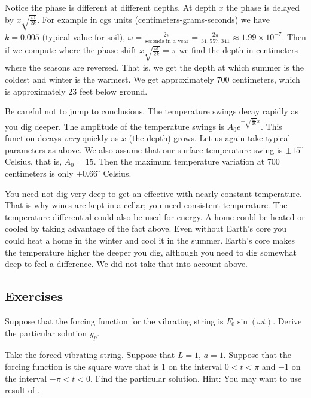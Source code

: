 Notice the phase is different at different depths.  At depth $x$ the
phase is delayed by $x \sqrt{\frac{\omega}{2k}}$.
For example in cgs units (centimeters-grams-seconds)
we have $k=0.005$ (typical value for soil),
$\omega = \frac{2\pi}{\text{seconds in a year}}
= \frac{2\pi}{31,557,341} \approx 1.99 \times {10}^{-7}$.   Then
if we compute where the phase shift $x \sqrt{\frac{\omega}{2k}} = \pi$
we find the depth in centimeters where the seasons are reversed.  That is,
we get the depth at which summer is the coldest and winter is the warmest.
We get
approximately 700 centimeters, which is approximately 23 feet below ground.

Be careful not to jump to conclusions.  The temperature swings decay rapidly as you dig deeper.  The
amplitude of the temperature swings is
$A_0 e^{-\sqrt{\frac{\omega}{2k}} x}$.  This function decays \emph{very}
quickly as $x$ (the depth) grows.
Let us again take
typical parameters as above.  We also assume that
our surface temperature swing is $\pm {15}^\circ$ Celsius, that is,
$A_0 = 15$.  Then the maximum temperature variation at 700 centimeters
is only $\pm {0.66}^\circ$ Celsius.

You need not dig very deep to get an effective
 with nearly constant temperature.  That is why wines are kept in a cellar; you need consistent
temperature.
The temperature differential could also be used for energy.  A home could
be heated or cooled by taking advantage of the fact above.
Even without Earth's core you could heat a home in the winter and cool it
in the summer.  Earth's core makes the
temperature higher the deeper you dig, although you need to dig somewhat
deep to feel a difference.
We did not take that into account above.

\subsection{Exercises}

\begin{exercise} \label{sps:sinforceexr}
Suppose that the forcing function for the vibrating string
is $F_0 \sin (\omega t)$.  Derive the particular solution $y_p$.
\end{exercise}

\begin{exercise}
Take the forced vibrating string.
Suppose that $L=1$, $a=1$.  Suppose that the forcing function
is the square wave that is 1 on the interval $0 < t < \pi$ and
$-1$ on the interval $-\pi < t < 0$.
Find the particular solution.  Hint: You may want to use result
of .
\end{exercise}

